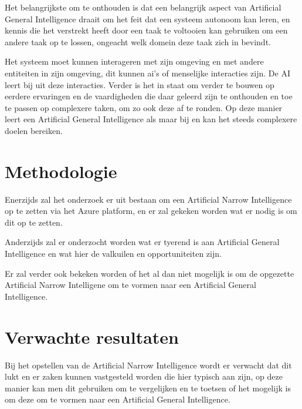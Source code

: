 Het belangrijkste om te onthouden is dat een belangrijk aspect van Artificial General Intelligence draait om het feit dat een systeem autonoom kan leren, en kennis die het verstrekt heeft door een taak te voltooien kan gebruiken om een andere taak op te lossen, ongeacht welk domein deze taak zich in bevindt. 

Het systeem moet kunnen interageren met zijn omgeving en met andere entiteiten in zijn omgeving, dit kunnen ai's of menselijke interacties zijn. De AI leert bij uit deze interacties. Verder is het in staat om verder te bouwen op eerdere ervaringen en de vaardigheden die daar geleerd zijn te onthouden en toe te passen op complexere taken, om zo ook deze af te ronden. Op deze manier leert een Artificial General Intelligence als maar bij en kan het steeds complexere doelen bereiken.

\autocite{goertzel2007artificial}


\section{Methodologie}
\label{sec:methodologie}
Enerzijds zal het onderzoek er uit bestaan om een Artificial Narrow Intelligence op te zetten via het Azure platform, en er zal gekeken worden wat er nodig is om dit op te zetten.

Anderzijds zal er onderzocht worden wat er tyerend is aan Artificial General Intelligence en wat hier de valkuilen en opportuniteiten zijn. 

Er zal verder ook bekeken worden of het al dan niet mogelijk is om de opgezette Artificial Narrow Intelligene om te vormen naar een Artificial General Intelligence. 

\section{Verwachte resultaten}
\label{sec:verwachte_resultaten}

Bij het opstellen van de Artificial Narrow Intelligence wordt er verwacht dat dit lukt en er zaken kunnen vastgesteld worden die hier typisch aan zijn, op deze manier kan men dit gebruiken om te vergelijken en te toetsen of het mogelijk is om deze om te vormen naar een Artificial General Intelligence.


